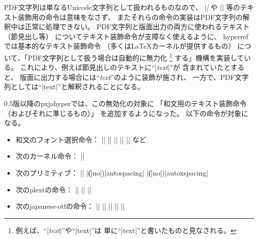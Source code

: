 \documentclass[uplatex,a4paper]{jsarticle}
\newcommand{\Pkg}[1]{\textsf{#1}}
\newcommand{\Means}{：\quad}
\begin{document}
PDF文字列は単なるUnicode文字列として扱われるものなので、
|\textit| や |\large| 等のテキスト装飾用の命令は意味をなさず、
またそれらの命令の実装はPDF文字列の解釈中は正常に処理できない。
PDF文字列と版面出力の両方に使われるテキスト（節見出し等）
についてテキスト装飾命令が支障なく使えるように、
\Pkg{hyperref}では基本的なテキスト装飾命令
（多くは{\LaTeX}カーネルが提供するもの）
について、「PDF文字列として扱う場合は自動的に無力化
\footnote{例えば、“|\textit{text}|”や“|{\large text}|”は
  単に“|text|”と書いたものと見なされる。}
する」機構を実装している。
これにより、例えば節見出しのテキストに“|\textit{text}|”が
含まれていたとすると、
版面に出力する場合には“\textit{text}”のように装飾が施され、
一方で、PDF文字列としては“|text|”と解釈されることになる。

0.5版以降の\Pkg{pxjahyper}では、この無効化の対象に
「和文用のテキスト装飾命令（およびそれに準じるもの）」
を追加するようになった。
以下の命令が対象になる。

\begin{itemize}
\item 和文のフォント選択命令\Means
  |\textmc| |\gtfamily| |\kanjifamily| |\useroman| |\userelfont|
  など
\item 次の{\pLaTeX}カーネル命令\Means
  |\<|
\item 次の{\pTeX}プリミティブ\Means
  |\inhibitglue| |\|(|no|)|autospacing| |\|(|no|)|autoxspacing|
\item 次の\Pkg{plext}の命令\Means
  |\bou| |\kasen| |\rensuji|
\item 次の\Pkg{japanese-otf}の命令\Means
  |\textmg| |\mgfamily| |\ltseries| |\ebseries| |\propshape|
\end{itemize}
\end{document}
